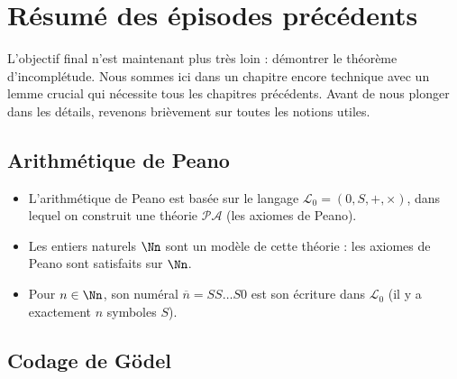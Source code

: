\documentclass[11pt,class=report,crop=false]{standalone}
\begin{document}



\section{Résumé des épisodes précédents}

L'objectif final n'est maintenant plus très loin : démontrer le théorème d'incomplétude. Nous sommes ici dans un chapitre encore technique avec un lemme crucial qui nécessite tous les chapitres précédents. Avant de nous plonger dans les détails, revenons brièvement sur toutes les notions utiles.

\subsection{Arithmétique de Peano}

\begin{itemize}
    \item L'arithmétique de Peano est basée sur le langage $\mathcal{L}_0 = (0, S, +, \times)$, dans lequel on construit une théorie $\mathcal{PA}$ (les axiomes de Peano).
    \item Les entiers naturels $\Nn$ sont un modèle de cette théorie : les axiomes de Peano sont satisfaits sur $\Nn$.
    \item Pour $n \in \Nn$, son numéral $\overline{n} = SS\dots S0$ est son écriture dans $\mathcal{L}_0$ (il y a exactement $n$ symboles $S$).
\end{itemize}

\subsection{Codage de Gödel}
\end{document}
